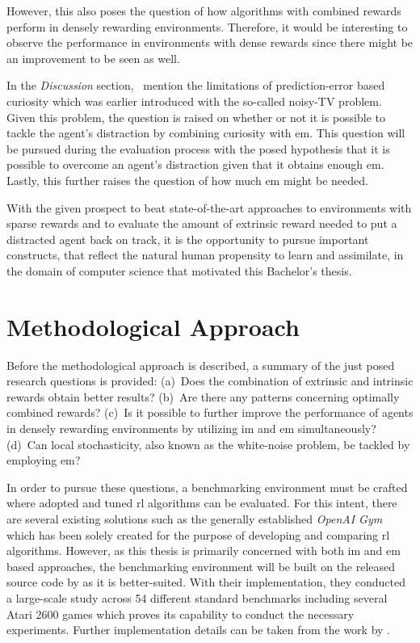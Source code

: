 \documentclass[draft,final]{vutinfth} %
\begin{document}
    However, this also poses the question of how algorithms with combined rewards perform in densely rewarding environments.
    Therefore, it would be interesting to observe the performance in environments with dense rewards since there might be an improvement to be seen as well.

    In the \textit{Discussion} section,~\citet{burda_large-scale_2018-1} mention the limitations of prediction-error based curiosity which was earlier introduced with the so-called noisy-TV problem.
    Given this problem, the question is raised on whether or not it is possible to tackle the agent's distraction by combining curiosity with \gls{em}.
    This question will be pursued during the evaluation process with the posed hypothesis that it is possible to overcome an agent's distraction given that it obtains enough \gls{em}.
    Lastly, this further raises the question of how much \gls{em} might be needed.

    With the given prospect to beat state-of-the-art approaches to environments with sparse rewards and to evaluate the amount of extrinsic reward needed to put a distracted agent back on track, it is the opportunity to pursue important constructs, that reflect the natural human propensity to learn and assimilate, in the domain of computer science that motivated this Bachelor's thesis.


    \section{Methodological Approach}\label{sec:methodological-approach}

    Before the methodological approach is described, a summary of the just posed research questions is provided: (a)~Does the combination of extrinsic and intrinsic rewards obtain better results? (b)~Are there any patterns concerning optimally combined rewards? (c)~Is it possible to further improve the performance of agents in densely rewarding environments by utilizing \gls{im} and \gls{em} simultaneously? (d)~Can local stochasticity, also known as the white-noise problem, be tackled by employing \gls{em}?

    In order to pursue these questions, a benchmarking environment must be crafted where adopted and tuned \gls{rl} algorithms can be evaluated.
    For this intent, there are several existing solutions such as the generally established \textit{OpenAI Gym} which has been solely created for the purpose of developing and comparing \gls{rl} algorithms.
    However, as this thesis is primarily concerned with both \gls{im} and \gls{em} based approaches, the benchmarking environment will be built on the released source code by \citet{burda_large-scale_2018-1} as it is better-suited.
    With their implementation, they conducted a large-scale study across 54 different standard benchmarks including several Atari 2600 games which proves its capability to conduct the necessary experiments.
    Further implementation details can be taken from the work by \citet{pathak_curiosity-driven_2017-1}.
\end{document}
